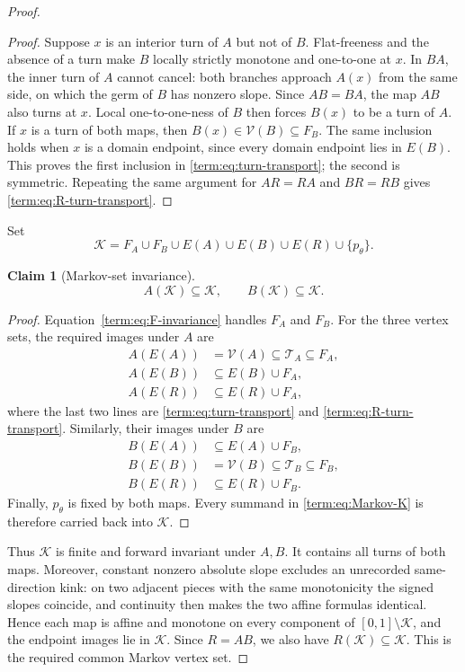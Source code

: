 \documentclass[11pt]{article}
\newtheorem{claim}[theorem]{Claim}
\theoremstyle{definition}
\theoremstyle{remark}
\newcommand{\I}{[0,1]}
\begin{document}
\begin{proof}
\begin{proof}
Suppose \(x\) is an interior turn of \(A\) but not of \(B\).  Flat-freeness
and the absence of a turn make \(B\) locally strictly monotone and
one-to-one at \(x\).  In \(BA\), the inner turn of \(A\) cannot cancel:
both branches approach \(A(x)\) from the same side, on which the germ of
\(B\) has nonzero slope.  Since \(AB=BA\), the map \(AB\) also turns at
\(x\).  Local one-to-one-ness of \(B\) then forces \(B(x)\) to be a turn of
\(A\).  If \(x\) is a turn of both maps, then
\(B(x)\in\mathcal V(B)\subseteq F_B\).  The same inclusion holds when \(x\)
is a domain endpoint, since every domain endpoint lies in \(E(B)\).
This proves the first inclusion in \eqref{term:eq:turn-transport}; the second
is symmetric.  Repeating the same argument for \(AR=RA\) and \(BR=RB\)
gives \eqref{term:eq:R-turn-transport}.
\end{proof}

Set
\begin{equation}\label{term:eq:Markov-K}
 \mathcal K=
 F_A\cup F_B\cup E(A)\cup E(B)\cup E(R)\cup\{p_\theta\}.
\end{equation}
\begin{claim}[Markov-set invariance]\label{clm:pl-Markov-invariance}
\[
 A(\mathcal K)\subseteq\mathcal K,\qquad
 B(\mathcal K)\subseteq\mathcal K.
\]
\end{claim}

\begin{proof}
Equation~\eqref{term:eq:F-invariance} handles \(F_A\) and \(F_B\).  For the
three vertex sets, the required images under \(A\) are
\[
\begin{aligned}
 A(E(A))&=\mathcal V(A)\subseteq\mathcal T_A\subseteq F_A,\\
 A(E(B))&\subseteq E(B)\cup F_A,\\
 A(E(R))&\subseteq E(R)\cup F_A,
\end{aligned}
\]
where the last two lines are
\eqref{term:eq:turn-transport} and
\eqref{term:eq:R-turn-transport}.  Similarly, their images under \(B\) are
\[
\begin{aligned}
 B(E(A))&\subseteq E(A)\cup F_B,\\
 B(E(B))&=\mathcal V(B)\subseteq\mathcal T_B\subseteq F_B,\\
 B(E(R))&\subseteq E(R)\cup F_B.
\end{aligned}
\]
Finally, \(p_\theta\) is fixed by both maps.  Every summand in
\eqref{term:eq:Markov-K} is therefore carried back into \(\mathcal K\).
\end{proof}

Thus \(\mathcal K\) is finite and forward invariant under \(A,B\).  It contains
all turns of both maps.  Moreover, constant nonzero absolute slope excludes
an unrecorded same-direction kink: on two adjacent pieces with the same
monotonicity the signed slopes coincide, and continuity then makes the two
affine formulas identical.  Hence each map is affine and monotone on every
component of $\I\setminus\mathcal K$, and the endpoint images lie in
$\mathcal K$.
Since \(R=AB\), we also have \(R(\mathcal K)\subseteq\mathcal K\).
This is the required common Markov vertex set.
\end{proof}
\end{document}
